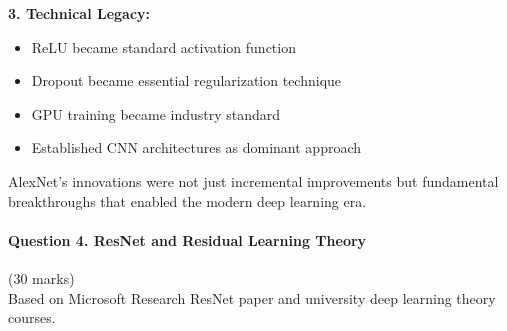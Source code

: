 \documentclass[12pt]{article}
\begin{document}
\begin{enumerate}[(a)]
{    \textbf{3. Technical Legacy:}
    \begin{itemize}
        \item ReLU became standard activation function
        \item Dropout became essential regularization technique  
        \item GPU training became industry standard
        \item Established CNN architectures as dominant approach
    \end{itemize}
    
    AlexNet's innovations were not just incremental improvements but fundamental breakthroughs that enabled the modern deep learning era.
    }
\end{enumerate}

\newpage
\paragraph{Question 4. ResNet and Residual Learning Theory}{\hfill (30 marks)}\\
Based on Microsoft Research ResNet paper and university deep learning theory courses.
\end{document}

